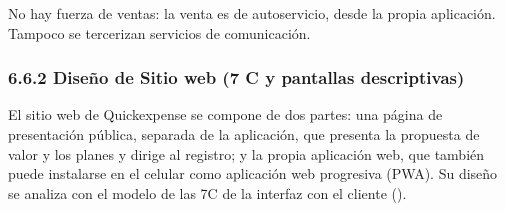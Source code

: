 No hay fuerza de ventas: la venta es de autoservicio, desde la propia
aplicación. Tampoco se tercerizan servicios de comunicación.

\subsubsection*{6.6.2 Diseño de Sitio web (7 C y pantallas
descriptivas)}\label{diseuxf1o-de-sitio-web-7-c-y-pantallas-descriptivas}

El sitio web de Quickexpense se compone de dos partes: una página de
presentación pública, separada de la aplicación, que presenta la
propuesta de valor y los planes y dirige al registro; y la propia
aplicación web, que también puede instalarse en el celular como
aplicación web progresiva (PWA). Su diseño se analiza con el modelo de
las 7C de la interfaz con el cliente ().

